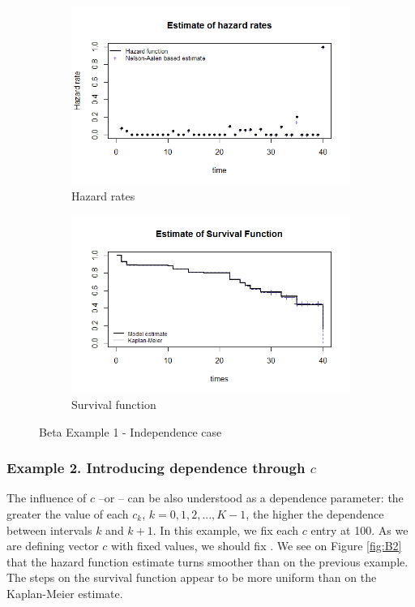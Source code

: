 \documentclass[letterpaper]{article}
\begin{document}
\begin{figure}
  \centering
  \begin{subfigure}[a]{\textwidth}\centering
    \includegraphics[width=\textwidth]{B11.png}
    \caption{Hazard rates}
  \end{subfigure}
  \begin{subfigure}[b]{\textwidth}\centering
    \includegraphics[width=\textwidth]{B12.png}
    \caption{Survival function}
  \end{subfigure}
  \caption{Beta Example 1 - Independence case}
  \label{fig:B1}
\end{figure}
 
\subsubsection{Example 2. Introducing dependence through $c$}

The influence of $c$ --or -- can be also understood as a dependence parameter: the greater the value of each $c_k$, $k=0,1,2,...,K-1$, the higher the dependence between intervals $k$ and $k+1$. In this example, we fix each $c$ entry at 100. As we are defining vector $c$ with fixed values, we should fix . We see on Figure \ref{fig:B2} that the hazard function estimate turns smoother than on the previous example. The steps on the survival function appear to be more uniform than on the Kaplan-Meier estimate. 
 
\end{document}

